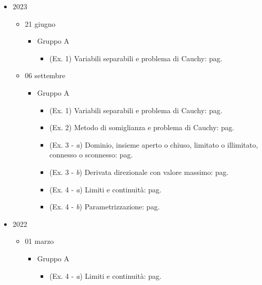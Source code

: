 \documentclass[a4paper]{article}
\begin{document}
	\begin{itemize}
		\item 2023
		\begin{itemize}
			\item 21 giugno
			\begin{itemize}
				\item Gruppo A
				\begin{itemize}
					\item (Ex. 1) Variabili separabili e problema di Cauchy: pag.~\pageref{exam: esame 21 giugno 2023 - Gruppo A - 1 esercizio}
				\end{itemize}
			\end{itemize}

			\item 06 settembre
			\begin{itemize}
				\item Gruppo A
				\begin{itemize}
					\item (Ex. 1) Variabili separabili e problema di Cauchy: pag.~\pageref{exam: esame 06 settembre 2023 - Gruppo A - 1 esercizio}
					\item (Ex. 2) Metodo di somiglianza e problema di Cauchy: pag.~\pageref{exam: esame 06 settembre 2023 - Gruppo A - 2 esercizio}
					\item (Ex. 3 - \emph{a}) Dominio, insieme aperto o chiuso, limitato o illimitato, connesso o sconnesso: pag.~\pageref{exam: esame 06 settembre 2023 - Gruppo A - 3 esercizio (a)}
					\item (Ex. 3 - \emph{b}) Derivata direzionale con valore massimo: pag.~\pageref{exam: esame 06 settembre 2023 - Gruppo A - 3 esercizio (b)}
					\item (Ex. 4 - \emph{a}) Limiti e continuità: pag.~\pageref{exam: esame 06 settembre 2023 - Gruppo A - 4 esercizio (a)}
					\item (Ex. 4 - \emph{b}) Parametrizzazione: pag.~\pageref{exam: esame 06 settembre 2023 - Gruppo A - 4 esercizio (b)}
				\end{itemize}
			\end{itemize}
		\end{itemize}

		\item 2022
		\begin{itemize}
			\item 01 marzo
			\begin{itemize}
				\item Gruppo A
				\begin{itemize}
					\item (Ex. 4 - \emph{a}) Limiti e continuità: pag.~\pageref{exam: esame 01 marzo 2022 - Gruppo A - 4 esercizio (a)}
				\end{itemize}
			\end{itemize}
		\end{itemize}
	\end{itemize}
\end{document}
